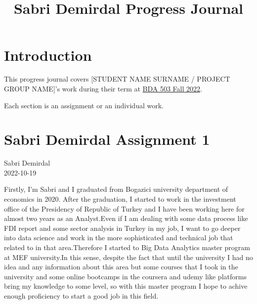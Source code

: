\documentclass[
  letterpaper,
  DIV=11,
  numbers=noendperiod]{scrreprt}
\title{Sabri Demirdal Progress Journal}
\author{}
\date{}
\renewcommand*\contentsname{Table of contents}
\newcommand\contentsname{Table of contents}
\begin{document}
\maketitle
\ifdefined\Shaded\renewenvironment{Shaded}{\begin{tcolorbox}[breakable, boxrule=0pt, interior hidden, frame hidden, sharp corners, enhanced, borderline west={3pt}{0pt}{shadecolor}]}{\end{tcolorbox}}\fi

\renewcommand*\contentsname{Table of contents}
{
\hypersetup{linkcolor=}
\setcounter{tocdepth}{2}
\tableofcontents
}

\hypertarget{introduction}{%
\chapter*{Introduction}\label{introduction}}

This progress journal covers {[}STUDENT NAME SURNAME / PROJECT GROUP
NAME{]}'s work during their term at
\href{https://mef-bda503.github.io/fall22/}{BDA 503 Fall 2022}.

Each section is an assignment or an individual work.


\hypertarget{sabri-demirdal-assignment-1}{%
\chapter{Sabri Demirdal Assignment
1}\label{sabri-demirdal-assignment-1}}

Sabri Demirdal\\
2022-10-19

\hfill\break

Firstly, I'm Sabri and I graduated from Bogazici university department
of economics in 2020. After the graduation, I started to work in the
investment office of the Presidency of Republic of Turkey and I have
been working here for almost two years as an Analyst.Even if I am
dealing with some data process like FDI report and some sector analysis
in Turkey in my job, I want to go deeper into data science and work in
the more sophisticated and technical job that related to in that
area.Therefore I started to Big Data Analytics master program at MEF
university.In this sense, despite the fact that until the university I
had no idea and any information about this area but some courses that I
took in the university and some online bootcamps in the coursera and
udemy like platforms bring my knowledge to some level, so with this
master program I hope to achive enough proficiency to start a good job
in this field.
\end{document}
